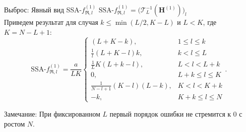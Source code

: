 \documentclass[ucs, notheorems, handout]{beamer}
\newcommand{\tX}[1]{\mathsf{#1}}
\newcommand{\iu}{\mathrm{i}\mkern1mu}
\begin{document}
\begin{frame}{Выброс: Явный вид SSA-$f^{(1)}_{\Re,l}$}
$\text{SSA-}f^{(1)}_{\Re, l} = \big( \mathcal{T}^{-1}_{L}(\mathbf{H}^{(1)})\big)_{l}$\\
\vspace{1em}
    Приведем результат для случая $k \leq \min(L/2, K - L)$ и $L < K$, где $K=N-L+1$:
$$\text{SSA-}f^{(1)}_{\Re, l} = \frac{a}{{LK}}
\begin{cases}
	(L + K - k), & \text{$1 \leq l \leq k$}\\
	\frac{1}{l}(L + K - l)k, & \text{$k < l \leq L$}\\
	\frac{1}{L}K(L + k - l), &\text{$L < l < L + k$}\\
	0, &\text{$L + k \leq l \leq K$}\\
	\frac{1}{N - l + 1}(K - l)(L - k), &\text{$K < l < K + k$}\\
	-k, &\text{$K + k \leq l \leq N $}
\end{cases}.$$

\alert{Замечание:} При фиксированном $L$ первый порядок ошибки не стремится к $0$ с ростом $N$.
\end{frame}

\end{document}
